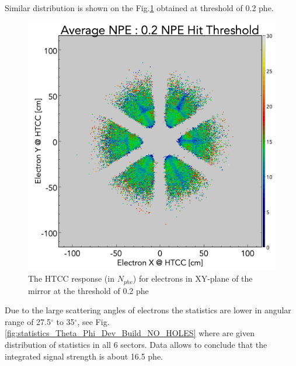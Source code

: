 Similar distribution is shown on the Fig.\ref{fig:avgNPE_XY_Dev_Build_02npe} obtained at threshold of 0.2 phe.
\begin{figure}[!ht]
    \centering
    \includegraphics[width=1.0\linewidth,trim={0.0cm 0.0cm 0.0cm 1.67cm},clip]{images/avgNPE_XY_Dev_Build_02npe.png}
    \caption{The HTCC response (in $N_{phe}$) for electrons in XY-plane of the mirror at the threshold of 0.2 phe}
    \label{fig:avgNPE_XY_Dev_Build_02npe}
\end{figure}
Due to the large scattering angles of electrons the statistics are lower in angular range of 27.5$^\circ$ to 35$^\circ$, see Fig.\ref{fig:statistics_Theta_Phi_Dev_Build_NO_HOLES} where are given distribution of statistics in all 6 sectors. Data allows to conclude that the integrated signal strength is about 16.5 phe.
